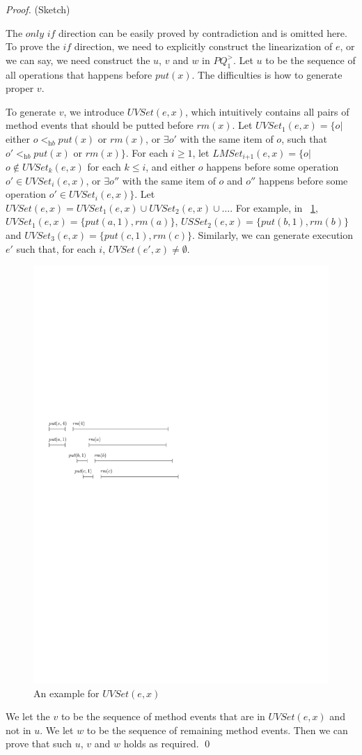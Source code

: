 \begin {proof} (Sketch)

The $\textit{only if}$ direction can be easily proved by contradiction and is omitted here. To prove the $\textit{if}$ direction, we need to explicitly construct the linearization of $e$, or we can say, we need construct the $u$, $v$ and $w$ in $\textit{PQ}_1^{>}$. Let $u$ to be the sequence of all operations that happens before $\textit{put}(x)$. The difficulties is how to generate proper $v$.

To generate $v$, we introduce $\textit{UVSet}(e,x)$, which intuitively contains all pairs of method events that should be putted before $\textit{rm}(x)$. Let $\textit{UVSet}_1(e,x)= \{ o \vert$ either $o <_{\textit{hb}} \textit{put}(x)$ or $\textit{rm}(x)$, or $\exists o'$ with the same item of $o$, such that $o' <_{\textit{hb}} \textit{put}(x)$ or $\textit{rm}(x)\}$. For each $i \geq 1$, let $\textit{LMSet}_{\textit{i+1}}(e,x) = \{ o \vert$ $o \notin \textit{UVSet}_k(e,x)$ for each $k \leq i$, and either $o$ happens before some operation $o' \in \textit{UVSet}_i(e,x)$, or $\exists o''$ with the same item of $o$ and $o''$ happens before some operation $o' \in \textit{UVSet}_i(e,x)\}$. Let $\textit{UVSet}(e,x) = \textit{UVSet}_1(e,x) \cup \textit{UVSet}_2(e,x) \cup \ldots$. For example, in \figurename~\ref{fig:his nobound of LMSet}, $\textit{UVSet}_1(e,x) = \{ \textit{put}(a,1),\textit{rm}(a) \}$, $\textit{USSet}_2(e,x) = \{ \textit{put}(b,1),\textit{rm}(b) \}$ and $\textit{UVSet}_3(e,x) = \{ \textit{put}(c,1),\textit{rm}(c) \}$. Similarly, we can generate execution $e'$ such that, for each $i$, $\textit{UVSet}(e',x) \neq \emptyset$.


\begin{figure}[htbp]
  \centering
  \includegraphics[width=0.5 \textwidth]{figures/PIC_HIS_NOBOUNDOF_LMSET.pdf}
  \caption{An example for $\textit{UVSet}(e,x)$}
  \label{fig:his nobound of LMSet}
\end{figure}

We let the $v$ to be the sequence of method events that are in $\textit{UVSet}(e,x)$ and not in $u$. We let $w$ to be the sequence of remaining method events. Then we can prove that such $u$, $v$ and $w$ holds as required. \qed
\end {proof}


